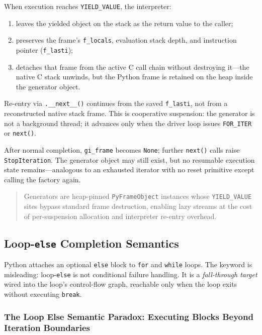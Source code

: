 \documentclass[a4paper,twoside]{report}
\begin{document}
When execution reaches \texttt{YIELD\_VALUE}, the interpreter:

\begin{enumerate}
    \item leaves the yielded object on the stack as the return value to the caller;
    \item preserves the frame's \texttt{f\_locals}, evaluation stack depth, and instruction pointer (\texttt{f\_lasti});
    \item detaches that frame from the active C call chain without destroying it---the native C stack unwinds, but the Python frame is retained on the heap inside the generator object.
\end{enumerate}

Re-entry via \texttt{.\_\_next\_\_()} continues from the saved \texttt{f\_lasti}, not from a reconstructed native stack frame. This is cooperative suspension: the generator is not a background thread; it advances only when the driver loop issues \texttt{FOR\_ITER} or \texttt{next()}.

After normal completion, \texttt{gi\_frame} becomes \texttt{None}; further \texttt{next()} calls raise \texttt{StopIteration}. The generator object may still exist, but no resumable execution state remains---analogous to an exhausted iterator with no reset primitive except calling the factory again.

\begin{quote}
Generators are heap-pinned \texttt{PyFrameObject} instances whose \texttt{YIELD\_VALUE} sites bypass standard frame destruction, enabling lazy streams at the cost of per-suspension allocation and interpreter re-entry overhead.
\end{quote}


\subsection{Loop-\texttt{else} Completion Semantics}

Python attaches an optional \texttt{else} block to \texttt{for} and \texttt{while} loops. The keyword is misleading: loop-\texttt{else} is not conditional failure handling. It is a \emph{fall-through target} wired into the loop's control-flow graph, reachable only when the loop exits without executing \texttt{break}.

\subsubsection{The Loop Else Semantic Paradox: Executing Blocks Beyond Iteration Boundaries}
\end{document}
